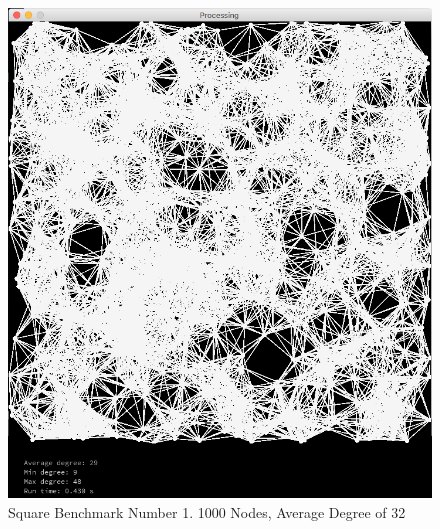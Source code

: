 \documentclass{article}
\begin{document}
\begin{center}
    \begin{figure}
        \includegraphics[scale=0.45]{./images/square_0.png}
        \caption{Square Benchmark Number 1. 1000 Nodes, Average Degree of 32}
        \label{square0}
    \end{figure}
\end{center}
\end{document}
